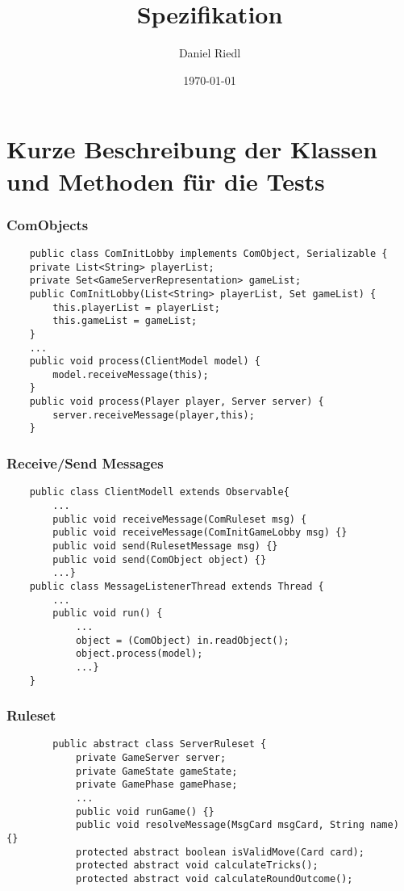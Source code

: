 \documentclass{beamer}
\title{Spezifikation}
\author{Daniel Riedl}
\date{\today}
\begin{document}
	\begin{frame}
		\titlepage
	\end{frame}
	
	\begin{frame}
		\tableofcontents
	\end{frame}
	
\section{Kurze Beschreibung der Klassen und Methoden für die Tests}
	
	\begin{frame}[fragile]
	\frametitle{ComObjects}
	\begin{lstlisting}
	public class ComInitLobby implements ComObject, Serializable {
	private List<String> playerList;
	private Set<GameServerRepresentation> gameList;
    public ComInitLobby(List<String> playerList, Set gameList) {
        this.playerList = playerList;
        this.gameList = gameList;
    }
	...
    public void process(ClientModel model) {
        model.receiveMessage(this);
    }
    public void process(Player player, Server server) {
        server.receiveMessage(player,this);
    }
	\end{lstlisting}
	\end{frame}
	
	\begin{frame}[fragile]
	\frametitle{Receive/Send Messages}
	\begin{lstlisting}
	public class ClientModell extends Observable{
		...
		public void receiveMessage(ComRuleset msg) {
		public void receiveMessage(ComInitGameLobby msg) {}
		public void send(RulesetMessage msg) {}
		public void send(ComObject object) {}
		...}
	public class MessageListenerThread extends Thread {
		...
		public void run() {
			...
			object = (ComObject) in.readObject();
			object.process(model);
			...}
	}		
	\end{lstlisting}
	\end{frame}
	
	\begin{frame}[fragile]
	\frametitle{Ruleset}
	\begin{lstlisting}
		public abstract class ServerRuleset {
			private GameServer server;
			private GameState gameState;
			private GamePhase gamePhase;
			...
			public void runGame() {}
			public void resolveMessage(MsgCard msgCard, String name) {}
			protected abstract boolean isValidMove(Card card);
			protected abstract void calculateTricks();
			protected abstract void calculateRoundOutcome();		
	\end{lstlisting}
	\end{frame}
	
\end{document}
